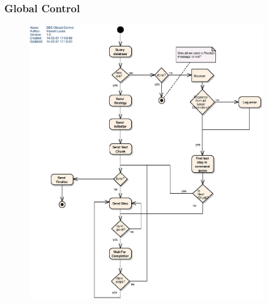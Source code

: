 \documentclass[10pt]{lofar}
\begin{document}
\subsubsection{Global Control}
\label{subsubsec:design-global-control}
\begin{figure}[!htb]
\centering
\includegraphics[width=0.9\textwidth]{images/bbs-global-control-activity-diagram}
\end{figure}
\end{document}
